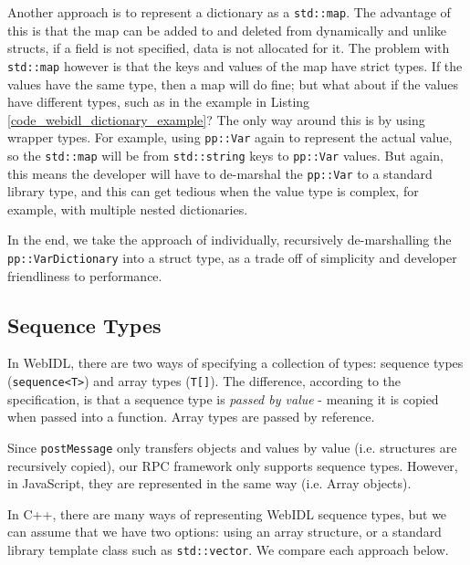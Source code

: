 Another approach is to represent a dictionary as a \lstinline{std::map}. The advantage of this is that the map can be added to and deleted from dynamically and unlike structs, if a field is not specified, data is not allocated for it. The problem with \lstinline{std::map} however is that the keys and values of the map have strict types. If the values have the same type, then a map will do fine; but what about if the values have different types, such as in the example in Listing \ref{code_webidl_dictionary_example}? The only way around this is by using wrapper types. For example, using \lstinline{pp::Var} again to represent the actual value, so the \lstinline{std::map} will be from \lstinline{std::string} keys to \lstinline{pp::Var} values. But again, this means the developer will have to de-marshal the \lstinline{pp::Var} to a standard library type, and this can get tedious when the value type is complex, for example, with multiple nested dictionaries.

In the end, we take the approach of individually, recursively de-marshalling the \lstinline{pp::VarDictionary} into a struct type, as a trade off of simplicity and developer friendliness to performance.

\subsection{Sequence Types} %
\label{sub:sequence_types}
In WebIDL, there are two ways of specifying a collection of types: sequence types (\lstinline{sequence<T>}) and array types (\lstinline{T[]}). The difference, according to the specification, is that a sequence type is \emph{passed by value} - meaning it is copied when passed into a function. Array types are passed by reference. 

Since \lstinline{postMessage} only transfers objects and values by value (i.e. structures are recursively copied), our RPC framework only supports sequence types. However, in JavaScript, they are represented in the same way (i.e. Array objects).

In C++, there are many ways of representing WebIDL sequence types, but we can assume that we have two options: using an array structure, or a standard library template class such as \lstinline{std::vector}. We compare each approach below.

